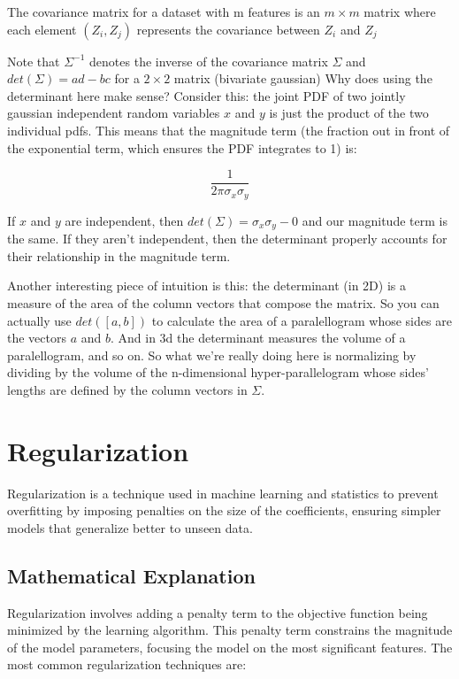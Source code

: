 \documentclass[12pt]{article}
\begin{document}
The covariance matrix for a dataset with m features is an \( m \times m \) matrix where each element \((Z_i,Z_j)\) represents the covariance between  \(Z_i\) and \(Z_j\)  

Note that \( \Sigma^{-1}\) denotes the inverse of the covariance matrix \(\Sigma\) and \(det(\Sigma) = ad - bc\) for a \(2 \times 2\) matrix (bivariate gaussian) Why does using the determinant here make sense? Consider this: the joint PDF of two jointly gaussian independent random variables \(x\) and \(y\) is just the product of the two individual pdfs. This means that the magnitude term (the fraction out in front of the exponential term, which ensures the PDF integrates to 1) is:

\[\frac{1}{2\pi \sigma_x \sigma_y}\]

If  \(x\) and \(y\) are independent, then \(det(\Sigma) = \sigma_x \sigma_y - 0\) and our magnitude term is the same. If they aren't independent, then the determinant properly accounts for their relationship in the magnitude term.  

Another interesting piece of intuition is this: the determinant (in 2D) is a measure of the area of the column vectors that compose the matrix. So you can actually use \(det([a,b])\) to calculate the area of a paralellogram whose sides are the vectors \(a\) and \(b\). And in 3d the determinant measures the volume of a paralellogram, and so on. So what we're really doing here is normalizing by dividing by the volume of the n-dimensional hyper-parallelogram whose sides' lengths are defined by the column vectors in \(\Sigma\). 

\section{Regularization}

Regularization is a technique used in machine learning and statistics to prevent overfitting by imposing penalties on the size of the coefficients, ensuring simpler models that generalize better to unseen data.

\subsection{Mathematical Explanation}

Regularization involves adding a penalty term to the objective function being minimized by the learning algorithm. This penalty term constrains the magnitude of the model parameters, focusing the model on the most significant features. The most common regularization techniques are:
\end{document}
